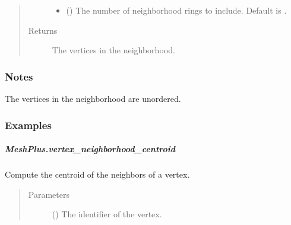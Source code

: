 \documentclass[letterpaper,10pt,english]{sphinxmanual}
\begin{document}
\begin{fulllineitems}
\begin{fulllineitems}
\begin{quote}
\begin{description}
\begin{itemize}
\item {} 
 () \textendash{} The number of neighborhood rings to include. Default is .

\end{itemize}

\item[{Returns}] \leavevmode
{} \textendash{} The vertices in the neighborhood.

\end{description}\end{quote}
\subsubsection*{Notes}

The vertices in the neighborhood are unordered.
\subsubsection*{Examples}

\begin{sphinxVerbatim}[commandchars=\\\{\}]
\end{sphinxVerbatim}

\end{fulllineitems}



\subparagraph{MeshPlus.vertex\_neighborhood\_centroid}
\label{\detokenize{api/generated/directional_clustering.mesh.MeshPlus.vertex_neighborhood_centroid:meshplus-vertex-neighborhood-centroid}}\label{\detokenize{api/generated/directional_clustering.mesh.MeshPlus.vertex_neighborhood_centroid::doc}}

\begin{fulllineitems}
\label{\detokenize{api/generated/directional_clustering.mesh.MeshPlus.vertex_neighborhood_centroid:directional_clustering.mesh.MeshPlus.vertex_neighborhood_centroid}}
Compute the centroid of the neighbors of a vertex.
\begin{quote}\begin{description}
\item[{Parameters}] \leavevmode
{} () \textendash{} The identifier of the vertex.


\end{description}
\end{quote}
\end{fulllineitems}
\end{fulllineitems}
\end{document}

